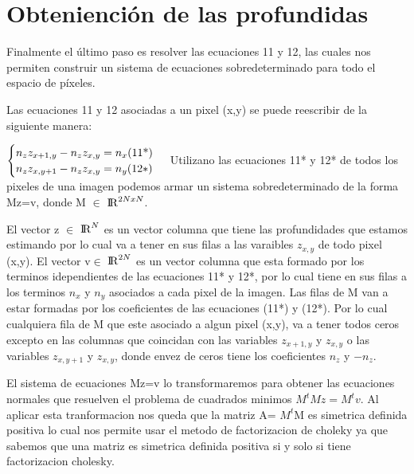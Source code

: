 \section{Obteniención de las profundidas}	

Finalmente el último paso es resolver las ecuaciones 11 y 12, las cuales nos permiten construir un sistema de ecuaciones sobredeterminado para todo el espacio de píxeles.\par
Las ecuaciones 11 y 12 asociadas a un pixel (x,y) se puede reescribir de la siguiente manera:\par
$\begin{cases}
n_{z} z_{x+1,y} - n_{z} z_{x,y}= n_{x} \text{(11*)}\\
n_{z} z_{x,y+1} - n_{z} z_{x,y}= n_{y}\text(12*)
\end{cases}$
\break
\indent Utilizano las ecuaciones 11* y 12* de todos los pixeles de una imagen podemos armar un sistema sobredeterminado de la forma Mz=v, donde M $\in$ ${\rm I\!R}^{2NxN}$. \par
\indent El vector z $\in$ ${\rm I\!R}^{N}$ es un vector columna que tiene las profundidades que estamos estimando por lo cual va a tener en sus filas a las varaibles $z_{x,y}$ de todo pixel (x,y). El vector v$\in$ ${\rm I\!R}^{2N}$ es un vector columna que esta formado por los terminos idependientes de las ecuaciones 11* y 12*, por lo cual tiene en sus filas a los terminos $n_{x}$ y $n_{y}$ asociados a cada pixel de la imagen. Las filas de M van a estar formadas por los coeficientes de las ecuaciones (11*) y (12*). Por lo cual cualquiera fila de M que este asociado a algun pixel (x,y), va a tener todos ceros excepto en las columnas que coincidan con las variables $z_{x+1,y}$ y $z_{x,y}$ o las variables  $z_{x,y+1}$ y $z_{x,y}$, donde envez de ceros tiene los coeficientes $n_{z}$ y $-n_{z}$.\par 
\indent El sistema de ecuaciones Mz=v lo transformaremos para obtener las ecuaciones normales que resuelven el problema de cuadrados minimos $M^{t}Mz=M^{t}v$. Al aplicar esta tranformacion nos queda que la matriz A= $M^{t}$M es simetrica definida positiva lo cual nos permite usar el metodo de factorizacion de choleky ya que sabemos que una matriz es simetrica definida positiva si y solo si tiene factorizacion cholesky.\par


